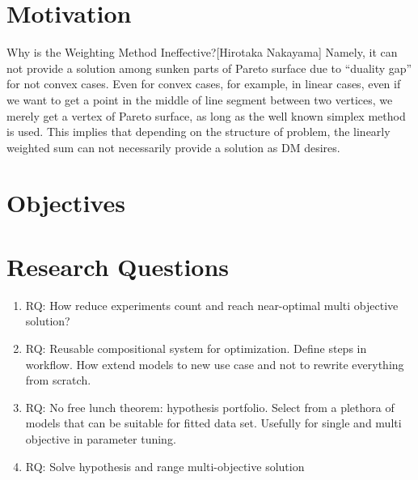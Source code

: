 \section{Motivation}
Why is the Weighting Method Ineffective?[Hirotaka Nakayama]
Namely, it can not provide a solution among sunken parts of Pareto surface due to “duality gap” for not convex cases. 
Even for convex cases, for example, in linear cases, even if we want to get a point in the middle of line segment between two vertices, we merely get a vertex of Pareto surface, as
long as the well known simplex method is used. This implies that depending on the structure of problem, the linearly weighted sum can not necessarily provide a solution as DM desires.

\section{Objectives}


\section{Research Questions}
\begin{enumerate}
    \item RQ: How reduce experiments count and reach near-optimal multi objective solution?
    \item RQ: Reusable compositional system for optimization. Define steps in workflow. How extend models to new use case and not to rewrite everything from scratch.
    \item RQ: No free lunch theorem: hypothesis portfolio. Select from a plethora of models that can be suitable for fitted data set. Usefully for single and multi objective in parameter tuning.
    \item RQ: Solve hypothesis and range multi-objective solution
\end{enumerate}



